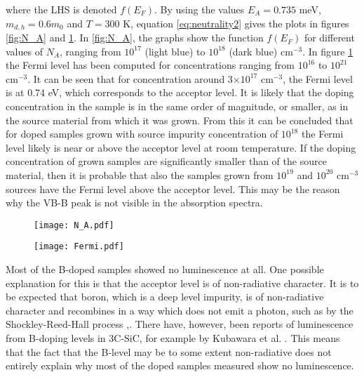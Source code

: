 where the LHS is denoted $f(E_F)$. By using the values $E_A = 0.735$ meV, $m_{d,h} = 0.6m_0$ and $T = 300$ K, equation \ref{eq:neutrality2} gives the plots in figures \ref{fig:N_A} and \ref{fig:fermi}. In \ref{fig:N_A}, the graphs show the function $f(E_F)$ for different values of $N_A$, ranging from $10^{17}$ (light blue) to $10^{18}$ (dark blue) cm$^{-3}$. In figure \ref{fig:fermi} the Fermi level has been computed for concentrations ranging from $10^{16}$ to $10^{21}$ cm$^{-3}$. It can be seen that for concentration around 3$\times10^{17}$ cm$^{-3}$, the Fermi level is at 0.74 eV, which corresponds to the acceptor level. It is likely that the doping concentration in the sample is in the same order of magnitude, or smaller, as in the source material from which it was grown. From this it can be concluded that for doped samples grown with source impurity concentration of $10^{18}$ the Fermi level likely is near or above the acceptor level at room temperature. If the doping concentration of grown samples are significantly smaller than of the source material, then it is probable that also the samples grown from $10^{19}$ and $10^{20}$ cm$^{-3}$ sources have the Fermi level above the acceptor level. This may be the reason why the VB-B peak is not visible in the absorption spectra. 

\begin{figure}[h]
\centering
\begin{minipage}{.5\textwidth}
  \centering
  \texttt{[image: N\_A.pdf]}
  \label{fig:N_A}
\end{minipage}%
\begin{minipage}{.5\textwidth}
  \centering
  \texttt{[image: Fermi.pdf]}
  \label{fig:fermi}
\end{minipage}
\end{figure}

Most of the B-doped samples showed no luminescence at all. One possible explanation for this is that the acceptor level is of non-radiative character. It is to be expected that boron, which is a deep level impurity, is of non-radiative character and recombines in a way which does not emit a photon, such as by the Shockley-Reed-Hall process \cite{Hall1952},\cite{Shockley1952}. There have, however, been reports of luminescence from B-doping levels in 3C-SiC, for example by Kubawara  et al. \cite{Company1976}. This means that the fact that the B-level may be to some extent non-radiative does not entirely explain why most of the doped samples measured show no luminescence. 

